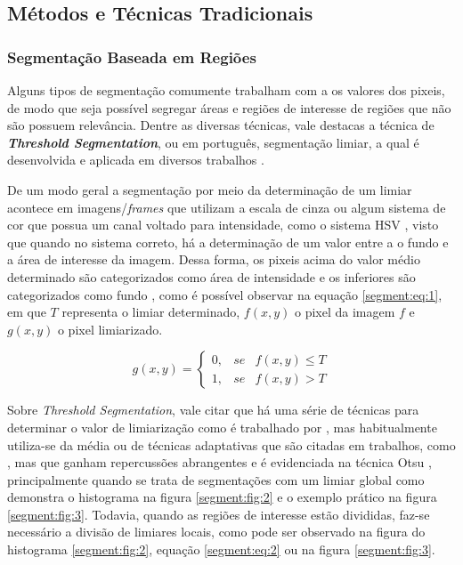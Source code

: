 \subsection{Métodos e Técnicas Tradicionais}
\label{segment:segment}
\subsubsection{Segmentação Baseada em Regiões}

Alguns tipos de segmentação comumente trabalham com a os valores dos pixeis, de modo que seja possível segregar áreas e regiões de interesse de regiões que não são possuem relevância. Dentre as diversas técnicas, vale destacas a técnica de \textbf{\textit{Threshold Segmentation}}, ou em português, segmentação limiar, a qual é desenvolvida e aplicada em diversos trabalhos \cite{Yanowitz1989}.

De um modo geral a segmentação por meio da determinação de um limiar acontece em imagens/\textit{frames} que utilizam a escala de cinza ou algum sistema de cor que possua um canal voltado para intensidade, como o sistema HSV \cite{schneider2003experimentos}, visto que quando no sistema correto, há a determinação de um valor entre a o fundo e a área de interesse da imagem. Dessa forma, os pixeis acima do valor médio determinado são categorizados como área de intensidade e os inferiores são categorizados como fundo \cite{pedrini2008analise}, como é possível observar na equação \ref{segment:eq:1}, em que $T$ representa o limiar determinado, $f(x,y)$ o pixel da imagem $f$ e $g(x,y)$ o pixel limiarizado.

\begin{equation}
\label{segment:eq:1}
    g(x,y) = \left\{\begin{matrix}
        0, & se & f(x,y) \leq T\\ 
        1, & se & f(x,y) > T
    \end{matrix}\right.
\end{equation}

Sobre \textit{Threshold Segmentation}, vale citar que há uma série de técnicas para determinar o valor de limiarização como é trabalhado por \cite{Al-amri2010ImageTechniques}, mas habitualmente utiliza-se da média \cite{Al-amri2010ImageTechniques, Yanowitz1989, Yuheng2017ImageOverview} ou de técnicas adaptativas que são citadas em trabalhos, como \cite{Yanowitz1989}, mas que ganham repercussões abrangentes e é evidenciada na técnica Otsu \cite{Otsu1979THRESHOLDHISTOGRAMS.}, principalmente quando se trata de segmentações com um limiar global como demonstra o histograma na figura \ref{segment:fig:2} e o exemplo prático na figura  \ref{segment:fig:3}. Todavia, quando as regiões de interesse estão divididas, faz-se necessário a divisão de limiares locais, como pode ser observado na figura do histograma \ref{segment:fig:2}, equação \ref{segment:eq:2} ou na figura \ref{segment:fig:3}.

